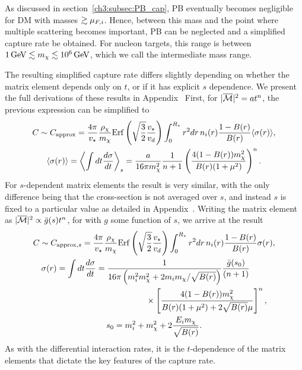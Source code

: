 As discussed in section~\ref{ch3:subsec:PB_cap}, PB eventually becomes negligible for DM with masses $\gtrsim \mu_{F,i}$. Hence, between this mass and the point where multiple scattering becomes important, PB can be neglected and a simplified capture rate be obtained. For nucleon targets, this range is between $1{\rm \,GeV}\lesssim m_\chi\lesssim 10^6{\rm \,GeV}$, which we call the intermediate mass range.

The resulting simplified capture rate differs slightly depending on whether the matrix element depends only on $t$, or if it has explicit $s$ dependence. We present the full derivations of these results in Appendix~
First, for $|\overline{\mathcal M}|^2=a t^n$, the previous expression can be simplified to 
\begin{gather}
        C \sim C_\mathrm{approx} = \frac{4\pi}{v_\star} \frac{\rho_\chi}{m_\chi}{\rm Erf}\left(\sqrt{\frac{3}{2}}\frac{v_\star}{v_d}\right)\int_0^{R_\star}  r^2 dr \, n_i(r)  \frac{1-B(r)}{B(r)} \langle\sigma(r)\rangle 
\label{ch3:eq:csimplelargemtext}, \\
\langle\sigma(r)\rangle = \left\langle\int dt \frac{d\sigma}{dt} \right\rangle_s =   \frac{a}{16\pi m_\chi^2 } \frac{1}{n+1}\left(\frac{4(1-B(r))m_\chi^2}{B(r)(1+\mu^2)}\right)^{n}. 
\label{ch3:eq:xsecave}
\end{gather}
For $s$-dependent matrix elements the result is very similar, with the only difference being that the cross-section is not averaged over $s$, and instead $s$ is fixed to a particular value as detailed in Appendix~. Writing the matrix element as $|\overline{\mathcal M}|^2 \propto \bar{g}(s)t^n$, for with $g$ some function of $s$, we arrive at the result
\begin{gather}
    C \sim C_{\mathrm{approx}, s} = \frac{4\pi}{v_\star} \frac{\rho_\chi}{m_\chi}{\rm Erf}\left(\sqrt{\frac{3}{2}}\frac{v_\star}{v_d}\right)\int_0^{R_\star}  r^2 dr \, n_i(r)  \frac{1-B(r)}{B(r)} \sigma(r)
\label{ch3:eq:csimplelargemtext_sdep}, \\
\begin{split}
    \sigma(r) = \int dt \frac{d\sigma}{dt} & =   \frac{1}{16\pi \left(m_i^2 m_\chi^2 + 2m_i m_\chi/\sqrt{B(r)}\right)}\frac{\bar{g}(s_0)}{(n+1)}\\
    &\hspace{6em}\times\left[\frac{4(1 - B(r)) m_\chi^2}{B(r)(1 + \mu^2) + 2\sqrt{B(r)}\mu}\right]^n,
\label{ch3:eq:xsecave_sdep}
\end{split}\\
s_0 = m_i^2 + m_\chi^2 + 2\frac{E_im_\chi}{\sqrt{B(r)}}.
\end{gather}
As with the differential interaction rates, it is the $t$-dependence of the matrix elements that dictate the key features of the capture rate.


